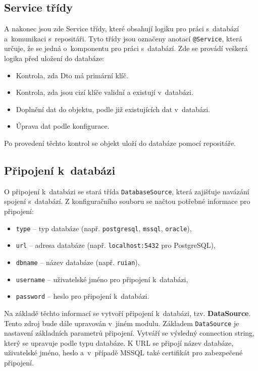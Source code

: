 \subsection{Service třídy}
\label{sec:serviceTridy}
A nakonec jsou zde Service třídy, které obsahují logiku pro práci s~databází a~komunikaci s~repositáři.
Tyto třídy jsou označeny anotací \texttt{@Service}, která určuje, že se jedná o~komponentu pro práci s~databází.
Zde se provádí veškerá logika před uložení do databáze:

\newpage

\begin{itemize}
    \item Kontrola, zda Dto má primární klíč.
    \item Kontrola, zda jsou cizí klíče validní a existují v~databázi.
    \item Doplnění dat do objektu, podle již existujících dat v~databázi.
    \item Úprava dat podle konfigurace.
\end{itemize}
Po provedení těchto kontrol se objekt uloží do databáze pomocí repositáře.

\subsection{Připojení k~databázi}
O připojení k~databázi se stará třída \texttt{DatabaseSource}, která zajišťuje navázání spojení s~databází.
Z konfiguračního souboru se načtou potřebné informace pro připojení:
\begin{itemize}
    \item \texttt{type} -- typ databáze (např. \texttt{postgresql}, \texttt{mssql}, \texttt{oracle}),
    \item \texttt{url} -- adresa databáze (např. \texttt{localhost:5432} pro PostgreSQL),
    \item \texttt{dbname} -- název databáze (např. \texttt{ruian}),
    \item \texttt{username} -- uživatelské jméno pro připojení k~databázi,
    \item \texttt{password} -- heslo pro připojení k~databázi.
\end{itemize}

Na základě těchto informací se vytvoří připojení k~databázi, tzv. \textbf{DataSource}.
Tento zdroj bude dále upravován v~jiném modulu.
Základem \texttt{DataSource} je nastavení základních parametrů připojení.
Vytváří se výsledný connection string, který se upravuje podle typu databáze.
K URL se připojí název databáze, uživatelské jméno, heslo a~v~případě MSSQL také certifikát pro zabezpečené připojení.

